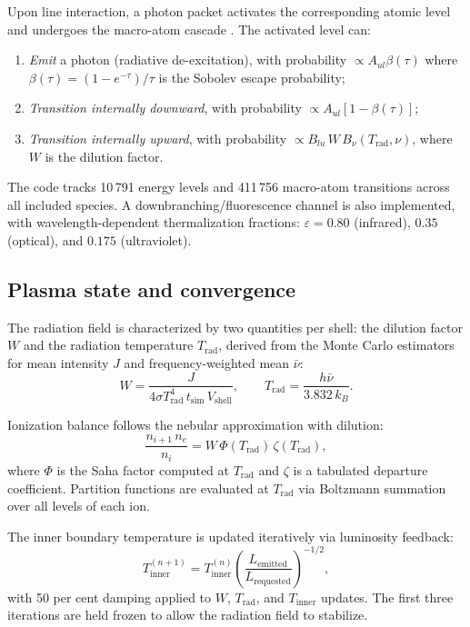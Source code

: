 \documentclass[fleqn,usenatbib]{mnras}
\begin{document}
Upon line interaction, a photon packet activates the corresponding atomic level and undergoes the macro-atom cascade \citep{lucy2002,lucy2003}. The activated level can:
\begin{enumerate}
    \item \textit{Emit} a photon (radiative de-excitation), with probability $\propto A_{ul} \beta(\tau)$ where $\beta(\tau) = (1 - e^{-\tau})/\tau$ is the Sobolev escape probability;
    \item \textit{Transition internally downward}, with probability $\propto A_{ul}[1 - \beta(\tau)]$;
    \item \textit{Transition internally upward}, with probability $\propto B_{lu}\, W\, B_\nu(T_\mathrm{rad}, \nu)$, where $W$ is the dilution factor.
\end{enumerate}

The code tracks 10\,791 energy levels and 411\,756 macro-atom transitions across all included species. A downbranching/fluorescence channel \citep{lucy2002} is also implemented, with wavelength-dependent thermalization fractions: $\varepsilon = 0.80$ (infrared), $0.35$ (optical), and $0.175$ (ultraviolet).

\subsection{Plasma state and convergence}
\label{sec:plasma}

The radiation field is characterized by two quantities per shell: the dilution factor $W$ and the radiation temperature $T_\mathrm{rad}$, derived from the Monte Carlo estimators for mean intensity $J$ and frequency-weighted mean $\bar{\nu}$:
\begin{equation}
W = \frac{J}{4\sigma T_\mathrm{rad}^4 \, t_\mathrm{sim} \, V_\mathrm{shell}} , \qquad
T_\mathrm{rad} = \frac{h \bar{\nu}}{3.832\, k_B} .
\label{eq:W_Trad}
\end{equation}

Ionization balance follows the nebular approximation with dilution:
\begin{equation}
\frac{n_{i+1}\, n_e}{n_i} = W\, \Phi(T_\mathrm{rad})\, \zeta(T_\mathrm{rad}) ,
\label{eq:saha}
\end{equation}
where $\Phi$ is the Saha factor computed at $T_\mathrm{rad}$ and $\zeta$ is a tabulated departure coefficient. Partition functions are evaluated at $T_\mathrm{rad}$ via Boltzmann summation over all levels of each ion.

The inner boundary temperature is updated iteratively via luminosity feedback:
\begin{equation}
T_\mathrm{inner}^{(n+1)} = T_\mathrm{inner}^{(n)} \left(\frac{L_\mathrm{emitted}}{L_\mathrm{requested}}\right)^{-1/2} ,
\label{eq:Tinner}
\end{equation}
with 50 per cent damping applied to $W$, $T_\mathrm{rad}$, and $T_\mathrm{inner}$ updates. The first three iterations are held frozen to allow the radiation field to stabilize.
\end{document}
